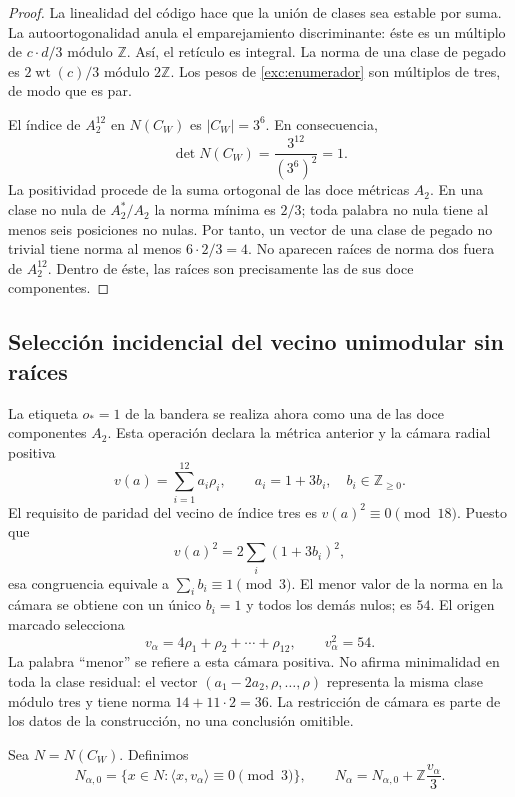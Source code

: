 \begin{proof}
La linealidad del código hace que la unión de clases sea estable por
suma. La autoortogonalidad anula el emparejamiento discriminante:
éste es un múltiplo de $c\cdot d/3$ módulo $\mathbb Z$. Así, el
retículo es integral. La norma de una clase de pegado es
$2\operatorname{wt}(c)/3$ módulo $2\mathbb Z$. Los pesos de
\eqref{exc:enumerador} son múltiplos de tres, de modo que es par.

El índice de $A_2^{12}$ en $N(C_W)$ es $|C_W|=3^6$. En consecuencia,
\[
 \det N(C_W)=\frac{3^{12}}{(3^6)^2}=1.
\]
La positividad procede de la suma ortogonal de las doce métricas $A_2$.
En una clase no nula de $A_2^*/A_2$ la norma mínima es $2/3$;
toda palabra no nula tiene al menos seis posiciones no nulas.
Por tanto, un vector de una clase de pegado no trivial tiene norma
al menos $6\cdot2/3=4$. No aparecen raíces de norma dos fuera de
$A_2^{12}$. Dentro de éste, las raíces son precisamente las de sus
doce componentes.
\end{proof}

\subsection{Selección incidencial del vecino unimodular sin raíces}
\label{exc:leech}

La etiqueta $o_*=1$ de la bandera se realiza ahora como una de las
doce componentes $A_2$. Esta operación declara la métrica anterior y
la cámara radial positiva
\[
 v(a)=\sum_{i=1}^{12}a_i\rho_i,
 \qquad a_i=1+3b_i,\quad b_i\in\mathbb Z_{\geq0}.
\]
El requisito de paridad del vecino de índice tres es
$v(a)^2\equiv0\pmod{18}$. Puesto que
\[
 v(a)^2=2\sum_i(1+3b_i)^2,
\]
esa congruencia equivale a $\sum_i b_i\equiv1\pmod3$. El menor
valor de la norma en la cámara se obtiene con un único $b_i=1$ y
todos los demás nulos; es $54$. El origen marcado selecciona
\begin{equation}
 v_\alpha=4\rho_1+\rho_2+\cdots+\rho_{12},
 \qquad v_\alpha^2=54.
 \label{exc:vector}
\end{equation}
La palabra ``menor'' se refiere a esta cámara positiva. No afirma
minimalidad en toda la clase residual: el vector
$(a_1-2a_2,\rho,\ldots,\rho)$ representa la misma clase módulo tres
y tiene norma $14+11\cdot2=36$. La restricción de cámara es parte
de los datos de la construcción, no una conclusión omitible.

Sea $N=N(C_W)$. Definimos
\begin{equation}
 N_{\alpha,0}=\{x\in N:\langle x,v_\alpha\rangle\equiv0\pmod3\},
 \qquad
 N_\alpha=N_{\alpha,0}+\mathbb Z\frac{v_\alpha}{3}.
 \label{exc:vecino}
\end{equation}

